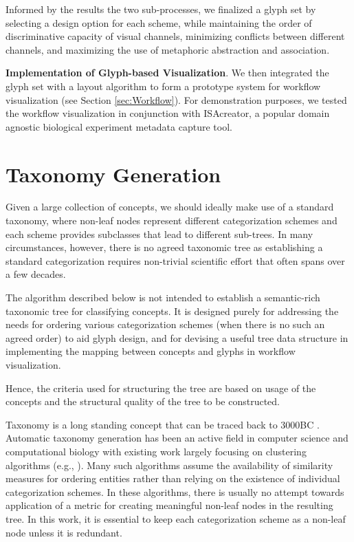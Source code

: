 Informed by the results the two sub-processes, we finalized a glyph set by selecting a design option for each scheme, while maintaining the order of discriminative capacity of visual channels, minimizing conflicts between different channels, and maximizing the use of metaphoric abstraction and association.

\textbf{Implementation of Glyph-based Visualization}. We then integrated the glyph set with a layout algorithm to form a prototype system for workflow visualization (see Section \ref{sec:Workflow}). For demonstration purposes, we tested the workflow visualization in conjunction with ISAcreator, a popular domain agnostic biological experiment metadata capture tool.

\section{Taxonomy Generation}
\label{sec:Taxonomy}

Given a large collection of concepts, we should ideally make use of a standard taxonomy, where non-leaf nodes represent different categorization schemes and each scheme provides subclasses that lead to different sub-trees. In many circumstances, however, there is no agreed taxonomic tree as establishing a standard categorization requires non-trivial scientific effort that often spans over a few decades.

The algorithm described below is not intended to establish a semantic-rich taxonomic tree for classifying concepts.
It is designed purely for addressing the needs for ordering various categorization schemes (when there is no such an agreed order) to aid glyph design, and for devising a useful tree data structure in implementing the mapping between concepts and glyphs in workflow visualization.

Hence, the criteria used for structuring the tree are based on usage of the concepts and the structural quality of the tree to be constructed.

Taxonomy is a long standing concept that can be traced back to 3000BC \cite{maguire12}. Automatic taxonomy generation has been an active field in computer science and computational biology with existing work largely focusing on clustering algorithms (e.g., \cite{krishnapuram03}). Many such algorithms assume the availability of similarity measures for ordering entities rather than relying on the existence of individual categorization schemes. In these algorithms, there is usually no attempt towards application of a metric for creating meaningful non-leaf nodes in the resulting tree. In this work, it is essential to keep each categorization scheme as a non-leaf node unless it is redundant.

